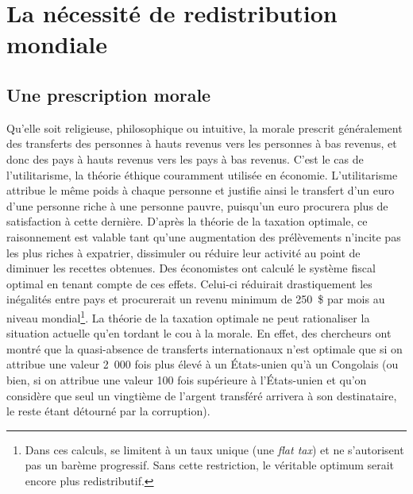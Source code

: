 \documentclass[a5paper,french,openany]{memoir}
\begin{document}
\chapter{La nécessité de redistribution mondiale\label{ch:redistribution_necessaire}}

\section{Une prescription morale}
Qu'elle soit religieuse, philosophique ou intuitive, la morale prescrit généralement des transferts des personnes à hauts revenus vers les personnes à bas revenus, et donc des pays à hauts revenus vers les pays à bas revenus. C'est le cas de l'utilitarisme, la théorie éthique couramment utilisée en économie. L'utilitarisme attribue le même poids à chaque personne et justifie ainsi le transfert d'un euro d'une personne riche à une personne pauvre, puisqu'un euro procurera plus de satisfaction à cette dernière. D'après la théorie de la taxation optimale, ce raisonnement est valable tant qu'une augmentation des prélèvements n'incite pas les plus riches à expatrier, dissimuler ou réduire leur activité au point de diminuer les recettes obtenues. Des économistes ont calculé le système fiscal optimal en tenant compte de ces effets. Celui-ci réduirait drastiquement les inégalités entre pays et procurerait un revenu minimum de 250~\$ par mois au niveau mondial\footnote{Dans ces calculs, \citet{kopczuk_limitations_2005} se limitent à un taux unique (une \textit{flat tax}) et ne s'autorisent pas un barème progressif. Sans cette restriction, le véritable optimum serait encore plus redistributif.}. %
La théorie de la taxation optimale ne peut rationaliser la situation actuelle qu'en tordant le cou à la morale. En effet, des chercheurs ont montré que la quasi-absence de transferts internationaux n'est optimale que si on attribue une valeur 2~000 fois plus élevé à un États-unien qu'à un Congolais (ou bien, si on attribue une valeur 100 fois supérieure à l'États-unien et qu'on considère que seul un vingtième de l'argent transféré arrivera à son destinataire, le reste étant détourné par la corruption). %
\end{document}
